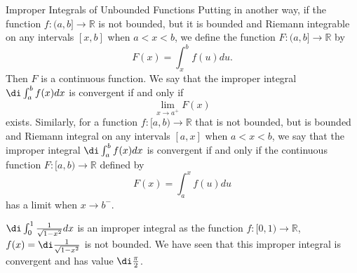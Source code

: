 \begin{example}[label=20230527]{}
\begin{highlight}{Improper Integrals of Unbounded Functions}
Putting in another way, if the function $f:(a, b]\to\mathbb{R}$ is not bounded, but  it is bounded and Riemann integrable on any  intervals $[x,b]$  when $a<x<b$, we define the function $F:(a,b]\to\mathbb{R}$ by
\[F(x)=\int_x^{b}f(u)du.\]
Then $F$ is a continuous function. We say that the improper integral $\di\int_a^{b}f(x)dx$ is convergent if and only if 
\[\lim_{x\to a^+}F(x)\] exists.
Similarly, for a function $f:[a,b)\to\mathbb{R}$ that is not bounded, but is bounded and Riemann integral on any  intervals $[a,x]$ when $a<x<b$,  we say that the improper integral $\di\int_{a}^bf(x)dx$ is convergent if and only if the continuous function $F:[a,b)\to\mathbb{R}$ defined by
\[F(x)=\int_{a}^x f(u)du\] has a limit when $x\to b^-$.
\end{highlight}
\begin{example}{}
$\di\int_0^1\frac{1}{\sqrt{1-x^2}}dx$ is an improper integral as the function $f:[0,1)\to\mathbb{R}$, $f(x)=\di \frac{1}{\sqrt{1-x^2}}$ is not bounded. We have seen that this improper integral is convergent and has value $\di \frac{\pi}{2}$.
\end{example}


\end{example}

